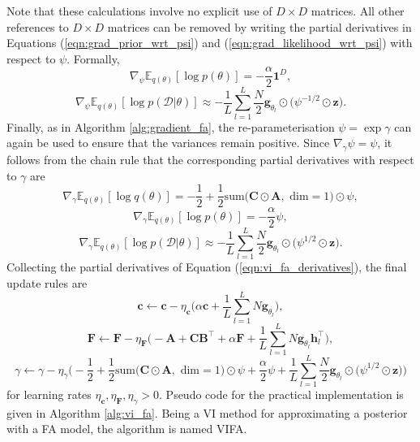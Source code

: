 \documentclass[msc,deptreport.inf]{infthesis} %
\newcommand{\matr}[1]{\mathbf{#1}}
\newcommand{\E}{\mathbb E}
\begin{document}
Note that these calculations involve no explicit use of $D \times D$ matrices. All other references to $D \times D$ matrices can be removed by writing the partial derivatives in Equations (\ref{eqn:grad_prior_wrt_psi}) and (\ref{eqn:grad_likelihood_wrt_psi}) with respect to $\psi$. Formally,
\begin{equation}
	\nabla_\psi \E_{q(\theta)} [\log p(\theta)] = -\frac{\alpha}{2} \matr{1}^D,
\end{equation}
\begin{equation}
	\nabla_\psi \E_{q(\theta)} [\log p(\mathcal{D} | \theta)]
	 \approx  -\frac{1}{L} \sum_{l=1}^{L} \frac{N}{2} \matr{g}_{\theta_l} \odot \big(\psi^{-1/2} \odot \matr{z} \big).
\end{equation}
Finally, as in Algorithm \ref{alg:gradient_fa}, the re-parameterisation $\psi = \exp \gamma$ can again be used to ensure that the variances remain positive. Since $\nabla_\gamma \psi = \psi$, it follows from the chain rule that the corresponding partial derivatives with respect to $\gamma$ are 
\begin{equation}
	\nabla_\gamma \E_{q(\theta)} [\log q(\theta)] = -\frac{1}{2} + \frac{1}{2} \text{sum}\big(\matr{C} \odot \matr{A}, \text{ dim} = 1\big) \odot \psi,
\end{equation}
\begin{equation}
	\nabla_\gamma \E_{q(\theta)} [\log p(\theta)] = -\frac{\alpha}{2} \psi,
\end{equation}
\begin{equation}
	\nabla_\gamma \E_{q(\theta)} [\log p(\mathcal{D} | \theta)]
	 \approx  -\frac{1}{L} \sum_{l=1}^{L} \frac{N}{2} \matr{g}_{\theta_l} \odot \big(\psi^{1/2} \odot \matr{z} \big).
\end{equation}
Collecting the partial derivatives of Equation (\ref{eqn:vi_fa_derivatives}), the final update rules are
 \begin{equation}\label{eqn:vifa_c_update}
	\matr{c} \leftarrow \matr{c} - \eta_\matr{c}\Bigg(
	\alpha \matr{c} + \frac{1}{L} \sum_{l=1}^{L} N \matr{g}_{\theta_l}
	\Bigg),
\end{equation}
 \begin{equation}\label{eqn:vifa_F_update}
	\matr{F} \leftarrow \matr{F} - \eta_\matr{F}\Bigg(
	-\matr{A}  + \matr{C} \matr{B}^\intercal+ \alpha \matr{F} + \frac{1}{L} \sum_{l=1}^{L} N \matr{g}_{\theta_l} \matr{h}_l^\intercal
	\Bigg),
\end{equation}
\begin{equation}\label{eqn:vifa_gamma_update}
	\gamma \leftarrow \gamma - \eta_\gamma\Bigg(
	-\frac{1}{2} + \frac{1}{2} \text{sum}\big(\matr{C} \odot \matr{A}, \text{ dim} = 1\big) \odot \psi
	+\frac{\alpha}{2} \psi + \frac{1}{L} \sum_{l=1}^{L} \frac{N}{2} \matr{g}_{\theta_l} \odot \big(\psi^{1/2} \odot \matr{z} \big)
	\Bigg)
\end{equation}
for learning rates $\eta_\matr{c},  \eta_\matr{F}, \eta_\gamma > 0$. Pseudo code for the practical implementation is given in Algorithm \ref{alg:vi_fa}. Being a VI method for approximating a posterior with a FA model, the algorithm is named VIFA.
\end{document}

